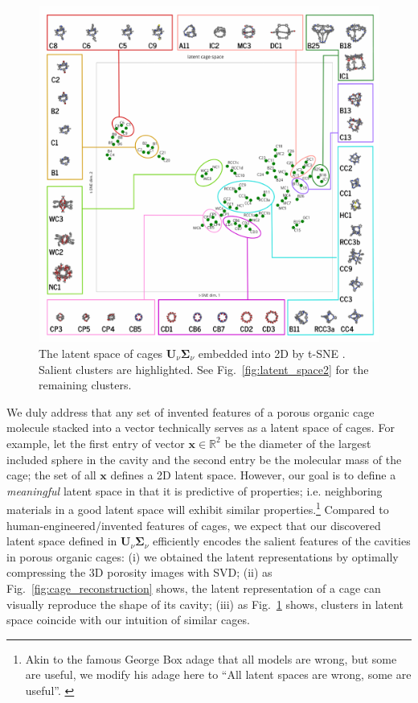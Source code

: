 \documentclass[journal=jacsat,manuscript=article,layout=traditional]{achemso}
\begin{document}
\begin{figure}
\centering
	\includegraphics[width=\columnwidth]{../latent_cage_space_2D_marked_main.pdf}
	\caption{The latent space of cages $\mathbf{U}_\nu \mathbf{\Sigma}_\nu$ embedded into 2D by t-SNE \cite{maaten2008visualizing,wattenberg2016how}. Salient clusters are highlighted. See Fig.~\ref{fig:latent_space2} for the remaining clusters.
	} \label{fig:latent_space}
\end{figure}

We duly address that any set of invented features of a porous organic cage molecule stacked into a vector technically serves as a latent space of cages. For example, let the first entry of vector $\mathbf{x}\in \mathbb{R}^2$ be the diameter of the largest included sphere in the cavity and the second entry be the molecular mass of the cage; the set of all $\mathbf{x}$ defines a 2D latent space. However, our goal is to define a \emph{meaningful} latent space in that it is predictive of properties; i.e. neighboring materials in a good latent space will exhibit similar properties.\footnote[3]{Akin to the famous George Box adage that all models are wrong, but some are useful, we modify his adage here to ``All latent spaces are wrong, some are useful''. \cite{box1976science}} Compared to human-engineered/invented features of cages, we expect that our discovered latent space defined in $\mathbf{U}_\nu \mathbf{\Sigma}_\nu$ efficiently encodes the salient features of the cavities in porous organic cages: (i) we obtained the latent representations by optimally compressing the 3D porosity images with SVD; (ii) as Fig.~\ref{fig:cage_reconstruction} shows, the latent representation of a cage can visually reproduce the shape of its cavity; (iii) as Fig.~\ref{fig:latent_space} shows, clusters in latent space coincide with our intuition of similar cages. 
\end{document}
